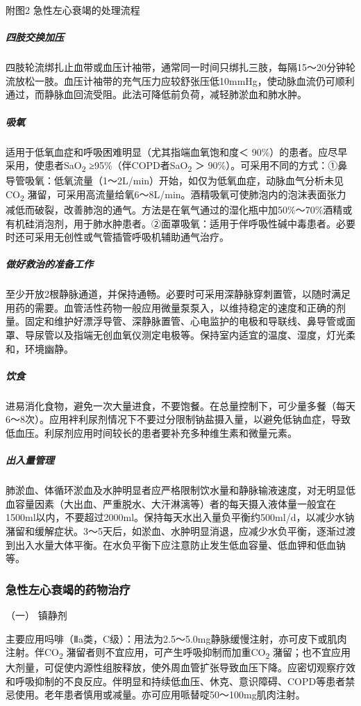 附图2 急性左心衰竭的处理流程

\subparagraph{四肢交换加压}

四肢轮流绑扎止血带或血压计袖带，通常同一时间只绑扎三肢，每隔15～20分钟轮流放松一肢。血压计袖带的充气压力应较舒张压低10mmHg，使动脉血流仍可顺利通过，而静脉血回流受阻。此法可降低前负荷，减轻肺淤血和肺水肿。

\subparagraph{吸氧}

适用于低氧血症和呼吸困难明显（尤其指端血氧饱和度＜
90\%）的患者。应尽早采用，使患者SaO\textsubscript{2}
≥95\%（伴COPD者SaO\textsubscript{2} ＞
90\%）。可采用不同的方式：①鼻导管吸氧：低氧流量（1～2L/min）开始，如仅为低氧血症，动脉血气分析未见CO\textsubscript{2}
潴留，可采用高流量给氧6～8L/min。酒精吸氧可使肺泡内的泡沫表面张力减低而破裂，改善肺泡的通气。方法是在氧气通过的湿化瓶中加50\%～70\%酒精或有机硅消泡剂，用于肺水肿患者。②面罩吸氧：适用于伴呼吸性碱中毒患者。必要时还可采用无创性或气管插管呼吸机辅助通气治疗。

\subparagraph{做好救治的准备工作}

至少开放2根静脉通道，并保持通畅。必要时可采用深静脉穿刺置管，以随时满足用药的需要。血管活性药物一般应用微量泵泵入，以维持稳定的速度和正确的剂量。固定和维护好漂浮导管、深静脉置管、心电监护的电极和导联线、鼻导管或面罩、导尿管以及指端无创血氧仪测定电极等。保持室内适宜的温度、湿度，灯光柔和，环境幽静。

\subparagraph{饮食}

进易消化食物，避免一次大量进食，不要饱餐。在总量控制下，可少量多餐（每天6～8次）。应用袢利尿剂情况下不要过分限制钠盐摄入量，以避免低钠血症，导致低血压。利尿剂应用时间较长的患者要补充多种维生素和微量元素。

\subparagraph{出入量管理}

肺淤血、体循环淤血及水肿明显者应严格限制饮水量和静脉输液速度，对无明显低血容量因素（大出血、严重脱水、大汗淋漓等）者的每天摄入液体量一般宜在1500ml以内，不要超过2000ml。保持每天水出入量负平衡约500ml/d，以减少水钠潴留和缓解症状。3～5天后，如淤血、水肿明显消退，应减少水负平衡，逐渐过渡到出入水量大体平衡。在水负平衡下应注意防止发生低血容量、低血钾和低血钠等。

\subsubsection{急性左心衰竭的药物治疗}

\hypertarget{text00071.htmlux5cux23CHP3-2-5-5-4-1}{}
（一） 镇静剂

主要应用吗啡（Ⅱa类，C级）：用法为2.5～5.0mg静脉缓慢注射，亦可皮下或肌肉注射。伴CO\textsubscript{2}
潴留者则不宜应用，可产生呼吸抑制而加重CO\textsubscript{2}
潴留；也不宜应用大剂量，可促使内源性组胺释放，使外周血管扩张导致血压下降。应密切观察疗效和呼吸抑制的不良反应。伴明显和持续低血压、休克、意识障碍、COPD等患者禁忌使用。老年患者慎用或减量。亦可应用哌替啶50～100mg肌肉注射。

